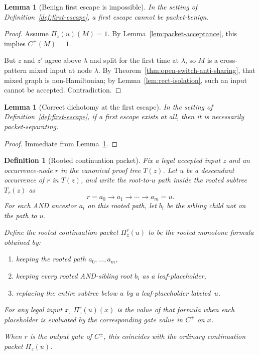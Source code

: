 \documentclass[11pt]{article}
\newtheorem{lemma}[theorem]{Lemma}
\newtheorem{definition}[theorem]{Definition}
\begin{document}
\begin{lemma}[Benign first escape is impossible]
\label{lem:benign-escape-impossible}
In the setting of Definition~\ref{def:first-escape}, a first escape
cannot be packet-benign.
\end{lemma}

\begin{proof}
Assume $\Pi_z(u)(M)=1$.  By Lemma~\ref{lem:packet-acceptance}, this
implies $C^{\pm}(M)=1$.

But $z$ and $z'$ agree above $\lambda$ and split for the first time at
$\lambda$, so $M$ is a cross-pattern mixed input at node $\lambda$.  By
Theorem~\ref{thm:open-switch-anti-sharing}, that mixed graph is
non-Hamiltonian; by Lemma~\ref{lem:rect-isolation}, such an input cannot
be accepted.  Contradiction.
\end{proof}

\begin{lemma}[Correct dichotomy at the first escape]
\label{lem:escape-dichotomy}
In the setting of Definition~\ref{def:first-escape}, if a first escape
exists at all, then it is necessarily packet-separating.
\end{lemma}

\begin{proof}
Immediate from Lemma~\ref{lem:benign-escape-impossible}.
\end{proof}


\begin{definition}[Rooted continuation packet]
\label{def:rooted-continuation-packet}
Fix a legal accepted input $z$ and an occurrence-node $r$ in the
canonical proof tree $T(z)$.  Let $u$ be a descendant occurrence of $r$
in $T(z)$, and write the root-to-$u$ path inside the rooted subtree
$T_r(z)$ as
\[
  r = a_0 \to a_1 \to \cdots \to a_m = u.
\]
For each AND ancestor $a_i$ on this rooted path, let $b_i$ be the
sibling child not on the path to $u$.

Define the \emph{rooted continuation packet} $\Pi^r_z(u)$ to be the
rooted monotone formula obtained by:
\begin{enumerate}
\item keeping the rooted path $a_0,\dots,a_m$,
\item keeping every rooted AND-sibling root $b_i$ as a leaf-placeholder,
\item replacing the entire subtree below $u$ by a leaf-placeholder
  labeled~$u$.
\end{enumerate}
For any legal input $x$, $\Pi^r_z(u)(x)$ is the value of that formula
when each placeholder is evaluated by the corresponding gate value in
$C^{\pm}$ on $x$.

When $r$ is the output gate of $C^{\pm}$, this coincides with the
ordinary continuation packet $\Pi_z(u)$.
\end{definition}
\end{document}
